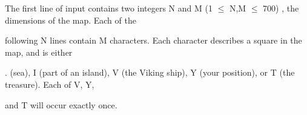 The first line of input contains two integers N and M (1 $\le$ N,M $\le$ 700) , the dimensions of the map. Each of the

following N lines contain M characters. Each character describes a square in the map, and is either

. (sea), I (part of an island), V (the Viking ship), Y (your position), or T (the treasure). Each of V, Y,

and T will occur exactly once.